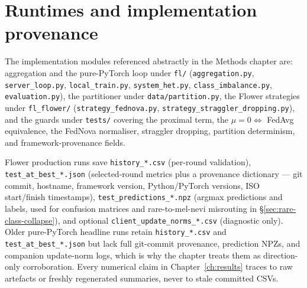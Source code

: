 \documentclass[11pt,a4paper]{report}
\begin{document}
\section{Runtimes and implementation provenance}
\label{app:provenance}

The implementation modules referenced abstractly in the Methods chapter are:
aggregation and the pure-PyTorch loop under \texttt{fl/} (\texttt{aggregation.py},
\texttt{server\_loop.py}, \texttt{local\_train.py}, \texttt{system\_het.py},
\texttt{class\_imbalance.py}, \texttt{evaluation.py}), the partitioner under
\texttt{data/partition.py}, the Flower strategies under \texttt{fl\_flower/}
(\texttt{strategy\_fednova.py}, \texttt{strategy\_straggler\_dropping.py}), and the
guards under \texttt{tests/} covering the proximal term, the
$\mu = 0 \Leftrightarrow$ FedAvg equivalence, the FedNova normaliser, straggler
dropping, partition determinism, and framework-provenance fields.

Flower production runs save \texttt{history\_*.csv} (per-round validation),
\texttt{test\_at\_best\_*.json} (selected-round metrics plus a provenance
dictionary --- git commit, hostname, framework version, Python/PyTorch versions,
ISO start/finish timestamps), \texttt{test\_predictions\_*.npz} (argmax
predictions and labels, used for confusion matrices and rare-to-mel-nevi
misrouting in §\ref{sec:rare-class-collapse}), and optional
\texttt{client\_update\_norms\_*.csv} (diagnostic only). Older pure-PyTorch
headline runs retain \texttt{history\_*.csv} and \texttt{test\_at\_best\_*.json}
but lack full git-commit provenance, prediction NPZs, and companion update-norm
logs, which is why the chapter treats them as direction-only corroboration. Every
numerical claim in Chapter~\ref{ch:results} traces to raw artefacts or freshly
regenerated summaries, never to stale committed CSVs.
\end{document}
